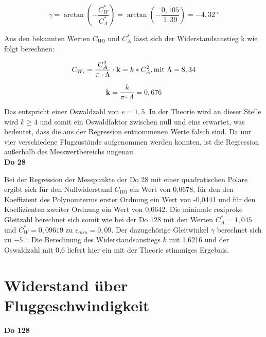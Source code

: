 \begin{equation}
\gamma=\arctan \left(-\frac{C^{*}_W}{C^{*}_A} \right)= \arctan \left(-\frac{0,105}{1,39} \right)= -4,32 \ ^{\circ}  
\end{equation}

Aus den bekannten Werten $C_{W0}$ und $C^{*}_A$ lässt sich der Widerstandsanstieg k wie folgt berechnen: 

\begin{equation}
C_{W_{i}}=\frac{C_A^2}{\pi \cdot \Lambda}\cdot \textbf{k}=k*C_A^2, \\ \mathrm{mit} \ \Lambda=8,34 
\end{equation}

\begin{equation}
\textbf{k}= \frac{k}{\pi \cdot \Lambda}=0,676
\end{equation}


Das entspricht einer Oswaldzahl von $e=1,5$. In der Theorie wird an dieser Stelle wird $k\geq 4$ und somit ein Oswaldfaktor zwischen null und eins erwartet, was bedeutet, dass die aus der Regression entnommenen Werte falsch sind. Da nur vier verschiedene Flugzustände aufgenommen werden konnten, ist die Regression außerhalb des Messwertbereichs ungenau. \\

\textbf{Do 28}

Bei der Regression der Messpunkte der Do 28 mit einer quadratischen Polare ergibt sich für den Nullwiderstand $C_{W0}$ ein Wert von 0,0678, für den den Koeffizient des Polynomterms erster Ordnung ein Wert von -0,0441 und für den Koeffizienten zweiter Ordnung ein Wert von 0,0642. Die minimale reziproke Gleitzahl berechnet sich somit wie bei der Do 128 mit den Werten 
$C^{*}_A=1,045$ und $C^{*}_W=0,09619$ zu $\epsilon_{min}=0,09$. 
Der dazugehörige Gleitwinkel $\gamma$ berechnet sich zu $-5 \ ^{\circ}$. Die Berechnung des Widerstandsanstiegs $k$ mit 1,6216 und der Oswaldzahl mit 0,6 liefert hier ein mit der Theorie stimmiges Ergebnis. 

\section{Widerstand über Fluggeschwindigkeit}

\textbf{Do 128}

